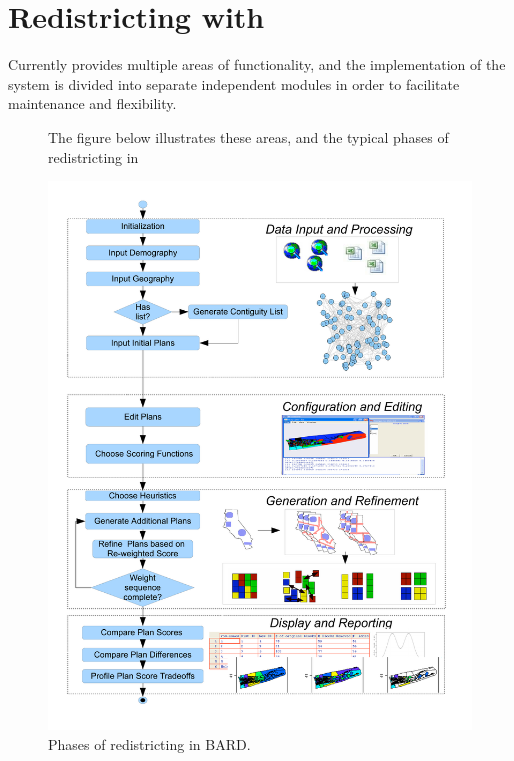 \documentclass[article]{JSSstyle/jss}
\begin{document}
\section[Redistricting with BARD]{Redistricting with }

Currently  provides multiple areas of functionality, and the implementation of the  system is divided into separate independent modules in order to facilitate maintenance and flexibility.

\begin{figure}[!h]
The figure below illustrates these areas, and the typical phases of redistricting in  

  \begin{center}
    \includegraphics[page=1]{bardiagram.pdf}
  \end{center}

  \caption{\small Phases of redistricting in BARD.}
  \label{fig:barddiagram}
\end{figure}
\end{document}
